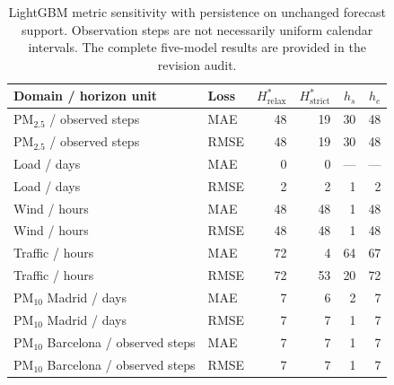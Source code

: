 \begin{table}[t]
\centering
\scriptsize
\setlength{\tabcolsep}{4pt}
\begin{tabular}{@{}llrrrr@{}}
\toprule
Domain / horizon unit & Loss & $H^*_{\mathrm{relax}}$ & $H^*_{\mathrm{strict}}$ & $h_s$ & $h_e$ \\
\midrule
PM$_{2.5}$ / observed steps & MAE & 48 & 19 & 30 & 48 \\
PM$_{2.5}$ / observed steps & RMSE & 48 & 19 & 30 & 48 \\
Load / days & MAE & 0 & 0 & --- & --- \\
Load / days & RMSE & 2 & 2 & 1 & 2 \\
Wind / hours & MAE & 48 & 48 & 1 & 48 \\
Wind / hours & RMSE & 48 & 48 & 1 & 48 \\
Traffic / hours & MAE & 72 & 4 & 64 & 67 \\
Traffic / hours & RMSE & 72 & 53 & 20 & 72 \\
PM$_{10}$ Madrid / days & MAE & 7 & 6 & 2 & 7 \\
PM$_{10}$ Madrid / days & RMSE & 7 & 7 & 1 & 7 \\
PM$_{10}$ Barcelona / observed steps & MAE & 7 & 7 & 1 & 7 \\
PM$_{10}$ Barcelona / observed steps & RMSE & 7 & 7 & 1 & 7 \\
\bottomrule
\end{tabular}
\caption{LightGBM metric sensitivity with persistence on unchanged forecast
support. Observation steps are not necessarily uniform calendar intervals.
The complete five-model results are provided in the revision audit.}
\label{tab:revision-rmse}
\end{table}
